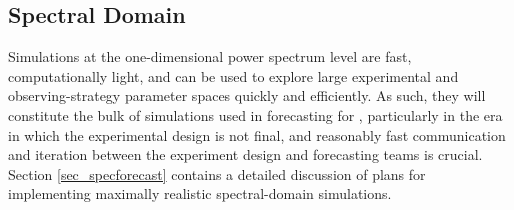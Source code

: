\subsection{Spectral Domain}

Simulations at the one-dimensional power spectrum level are fast, computationally light, and can 
be used to explore large experimental and observing-strategy parameter spaces quickly and efficiently.
As such, they will constitute the bulk of simulations used in forecasting for \cmbexp, particularly in
the era in which the experimental design is not final, and reasonably fast communication and iteration
between the experiment design and forecasting teams is crucial. Section 
\ref{sec_specforecast} contains a detailed discussion of plans for
implementing maximally realistic spectral-domain simulations.




%



